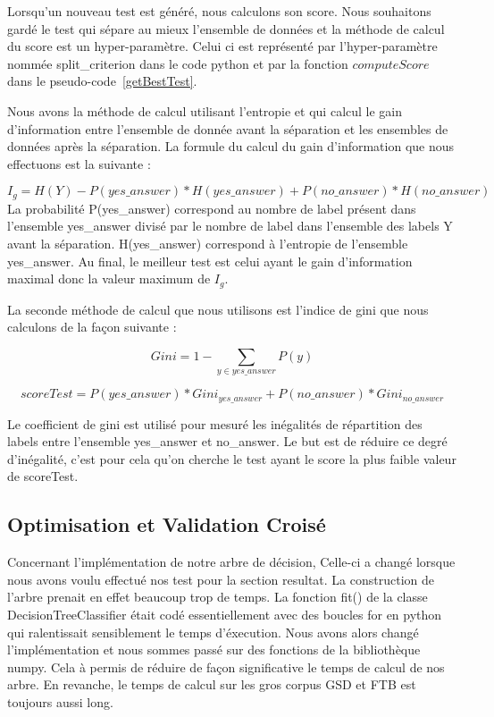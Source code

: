\documentclass[french, 14pt]{memoir}
\begin{document}
Lorsqu'un nouveau test est généré, nous calculons son score. Nous souhaitons gardé le test qui sépare au mieux l'ensemble de données et la méthode de calcul du score est un hyper-paramètre. Celui ci est représenté par l'hyper-paramètre nommée split\_criterion dans le code python et par la fonction $computeScore$ dans le pseudo-code~\ref{getBestTest}.

 Nous avons la méthode de calcul utilisant l'entropie et qui calcul le gain d'information entre l'ensemble de donnée avant la séparation et les ensembles de données après la séparation. La formule du calcul du gain d'information que nous effectuons est la suivante :

\begin{equation}
I_{g} = H(Y) - P(yes\_answer) * H(yes\_answer) + P(no\_answer) * H(no\_answer)
\end{equation}
La probabilité P(yes\_answer) correspond au nombre de label présent dans l'ensemble yes\_answer divisé par le nombre de label dans l'ensemble des labels Y avant la séparation. H(yes\_answer) correspond à l'entropie de l'ensemble yes\_answer. Au final, le meilleur test est celui ayant le gain d'information maximal donc la valeur maximum de $I_g$.

La seconde méthode de calcul que nous utilisons est l'indice de gini que nous calculons de la façon suivante :

\begin{equation}
Gini = 1 - \sum_{y \in yes\_answer}P(y)
\end{equation}

\begin{equation}
scoreTest = P(yes\_answer) * Gini_{yes\_answer} + P(no\_answer) * Gini_{no\_answer}
\end{equation}

Le coefficient de gini est utilisé pour mesuré les inégalités de répartition des labels entre l'ensemble yes\_answer et no\_answer. Le but est de réduire ce degré d'inégalité, c'est pour cela qu'on cherche le test ayant le score la plus faible valeur de scoreTest.

\subsection{Optimisation et Validation Croisé}

Concernant l'implémentation de notre arbre de décision, Celle-ci a changé lorsque nous avons voulu effectué nos test pour la section resultat. La construction de l'arbre prenait en effet beaucoup trop de temps. La fonction fit() de la classe DecisionTreeClassifier était codé essentiellement avec des boucles for en python qui ralentissait sensiblement le temps d'éxecution. Nous avons alors changé l'implémentation et nous sommes passé sur des fonctions de la bibliothèque numpy. Cela à permis de réduire de façon significative le temps de calcul de nos arbre. En revanche, le temps de calcul sur les gros corpus GSD et FTB est toujours aussi long. 
\end{document}
